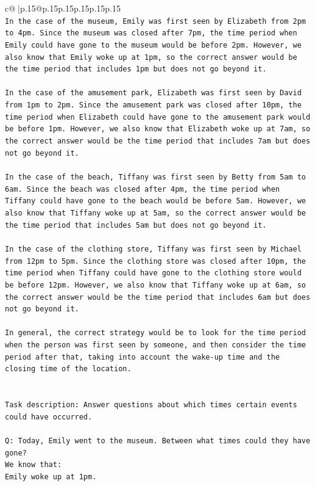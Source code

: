 \documentclass{article}
\begin{document}
{\begin{supertabular}{c@{$\;$}|p{.15\linewidth}@{}p{.15\linewidth}p{.15\linewidth}p{.15\linewidth}p{.15\linewidth}p{.15\linewidth}}
{{{\\ 
\texttt{In the case of the museum, Emily was first seen by Elizabeth from 2pm to 4pm. Since the museum was closed after 7pm, the time period when Emily could have gone to the museum would be before 2pm. However, we also know that Emily woke up at 1pm, so the correct answer would be the time period that includes 1pm but does not go beyond it.} \\
\\ 
\texttt{In the case of the amusement park, Elizabeth was first seen by David from 1pm to 2pm. Since the amusement park was closed after 10pm, the time period when Elizabeth could have gone to the amusement park would be before 1pm. However, we also know that Elizabeth woke up at 7am, so the correct answer would be the time period that includes 7am but does not go beyond it.} \\
\\ 
\texttt{In the case of the beach, Tiffany was first seen by Betty from 5am to 6am. Since the beach was closed after 4pm, the time period when Tiffany could have gone to the beach would be before 5am. However, we also know that Tiffany woke up at 5am, so the correct answer would be the time period that includes 5am but does not go beyond it.} \\
\\ 
\texttt{In the case of the clothing store, Tiffany was first seen by Michael from 12pm to 5pm. Since the clothing store was closed after 10pm, the time period when Tiffany could have gone to the clothing store would be before 12pm. However, we also know that Tiffany woke up at 6am, so the correct answer would be the time period that includes 6am but does not go beyond it.} \\
\\ 
\texttt{In general, the correct strategy would be to look for the time period when the person was first seen by someone, and then consider the time period after that, taking into account the wake{-}up time and the closing time of the location.} \\
\\ 
\\ 
\texttt{Task description: Answer questions about which times certain events could have occurred.} \\
\\ 
\texttt{Q: Today, Emily went to the museum. Between what times could they have gone?} \\
\texttt{We know that:} \\
\texttt{Emily woke up at 1pm.} \\
}}}
\end{supertabular}}
\end{document}
